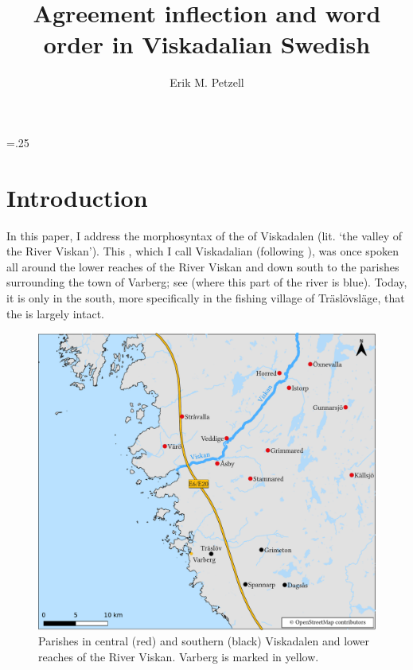 \documentclass[output=paper,colorlinks,citecolor=brown,draft,draftmode]{langscibook}
\author{Erik M. Petzell\affiliation{Institute for Language and Folklore, Gothenburg}}
\title{Agreement inflection and word order in Viskadalian Swedish}
\begin{document}
\multicolsep=.25\baselineskip
\maketitle


\section{Introduction}\label{sec:petzell:1}


In this paper, I address the morphosyntax of the   of Viskadalen (lit. ‘the valley of the River Viskan’). This , which I call Viskadalian (following \citealt{Petzell2017}), was once spoken all around the lower reaches of the River Viskan and down south to the parishes surrounding the town of Varberg; see  (where this part of the river is blue). Today, it is only in the south, more specifically in the fishing village of Träslövsläge, that the  is largely intact. 

\begin{figure}
\includegraphics[width=\textwidth]{figures/lmswe-latest-compressed.pdf}
\caption{\label{figmap:petzell:1}\label{figmap:petzell:2}Parishes in central (red) and southern (black) Viskadalen and lower reaches of the River Viskan. Varberg is marked in yellow.}
\end{figure}
\end{document}
